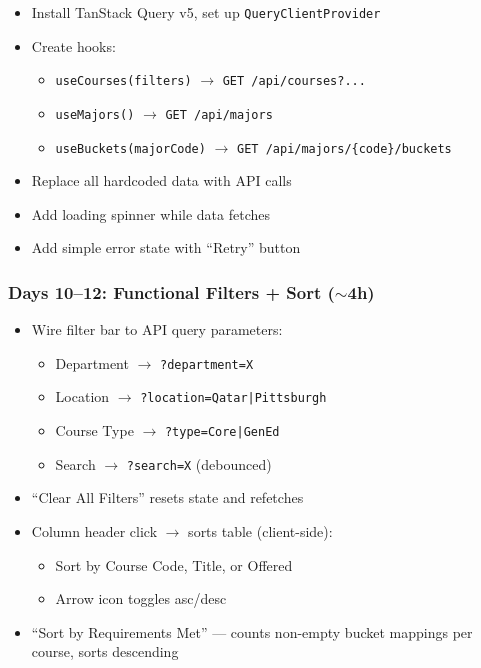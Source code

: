 \documentclass[11pt]{article}
\begin{document}
\begin{itemize}[leftmargin=2em]
    \item Install TanStack Query v5, set up \texttt{QueryClientProvider}
    \item Create hooks:
    \begin{itemize}
        \item \texttt{useCourses(filters)} $\rightarrow$ \texttt{GET /api/courses?...}
        \item \texttt{useMajors()} $\rightarrow$ \texttt{GET /api/majors}
        \item \texttt{useBuckets(majorCode)} $\rightarrow$ \texttt{GET /api/majors/\{code\}/buckets}
    \end{itemize}
    \item Replace all hardcoded data with API calls
    \item Add loading spinner while data fetches
    \item Add simple error state with ``Retry'' button
\end{itemize}

\subsubsection{Days 10--12: Functional Filters + Sort ($\sim$4h)}

\begin{itemize}[leftmargin=2em]
    \item Wire filter bar to API query parameters:
    \begin{itemize}
        \item Department $\rightarrow$ \texttt{?department=X}
        \item Location $\rightarrow$ \texttt{?location=Qatar|Pittsburgh}
        \item Course Type $\rightarrow$ \texttt{?type=Core|GenEd}
        \item Search $\rightarrow$ \texttt{?search=X} (debounced)
    \end{itemize}
    \item ``Clear All Filters'' resets state and refetches
    \item Column header click $\rightarrow$ sorts table (client-side):
    \begin{itemize}
        \item Sort by Course Code, Title, or Offered
        \item Arrow icon toggles asc/desc
    \end{itemize}
    \item ``Sort by Requirements Met'' — counts non-empty bucket mappings per course, sorts descending
\end{itemize}
\end{document}
